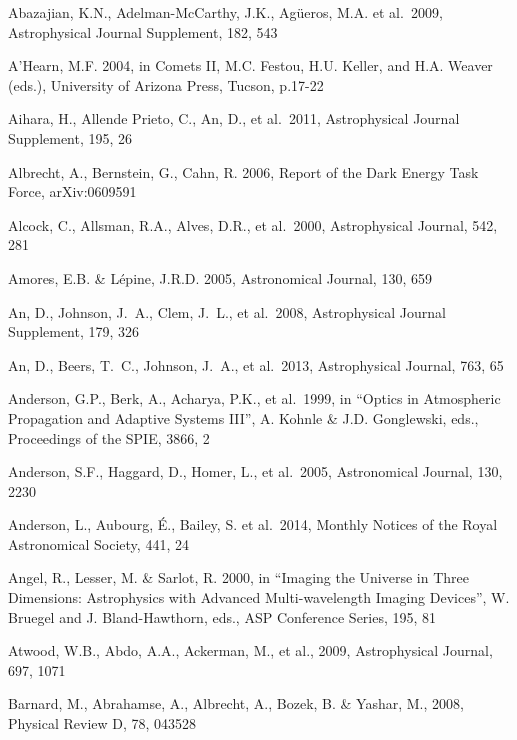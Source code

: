 \documentclass{emulateapj}
\begin{document}
\vskip 0.3in
\begin{thebibliography}{}

\bibitem[()]{} Abazajian, K.N., Adelman-McCarthy, J.K., Ag\"ueros,
  M.A. et al.~2009, Astrophysical Journal Supplement, 182, 543

\bibitem[()]{} A'Hearn, M.F. 2004, in Comets II, M.C. Festou, H.U. Keller, and H.A. Weaver (eds.), 
             University of  Arizona Press, Tucson, p.17-22 

\bibitem[()]{} Aihara, H., Allende Prieto, C., An, D., et al.~2011,
  Astrophysical Journal Supplement, 195, 26


\bibitem[()]{} Albrecht, A., Bernstein, G., Cahn, R. 2006, Report of
  the Dark Energy Task Force, arXiv:0609591

\bibitem[()]{} Alcock, C., Allsman, R.A., Alves, D.R., et al.~2000, Astrophysical Journal, 542, 281  

\bibitem[()]{} Amores, E.B. \& L\'{e}pine, J.R.D. 2005, Astronomical Journal, 130, 659

\bibitem[()]{} An, D., Johnson, J.~A., Clem, J.~L., et al.~2008, Astrophysical Journal Supplement, 179, 326

\bibitem[()]{} An, D., Beers, T.~C., Johnson, J.~A., et al.~2013, Astrophysical Journal, 763, 65

\bibitem[()]{} Anderson, G.P., Berk, A., Acharya, P.K., et al.~1999, in ``Optics in
             Atmospheric Propagation and Adaptive Systems III'',  A. Kohnle \& J.D. Gonglewski,
             eds., Proceedings of the SPIE, 3866, 2

\bibitem[()]{} Anderson, S.F., Haggard, D., Homer, L., et al.~2005, Astronomical Journal, 130, 2230

\bibitem[()]{} Anderson, L., Aubourg, \'E., Bailey, S. et al.~2014,
  Monthly Notices of the Royal Astronomical Society, 441, 24

\bibitem[()]{} Angel, R., Lesser, M. \& Sarlot, R. 2000, in  ``Imaging the Universe in Three 
             Dimensions: Astrophysics with Advanced Multi-wavelength Imaging Devices'',
             W. Bruegel and J. Bland-Hawthorn, eds., ASP Conference Series, 195, 81

\bibitem[()]{} Atwood, W.B., Abdo, A.A., Ackerman, M., et al., 2009, Astrophysical Journal, 697, 1071

\bibitem[()]{} Barnard, M., Abrahamse, A., Albrecht, A., Bozek, B. \& Yashar, M., 2008, Physical Review D, 78, 043528


\end{thebibliography}
\end{document}

